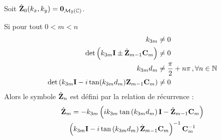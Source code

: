         \begin{thm}
            Soit $\hat {\mathbf{Z}}_0(k_x,k_y) = \mathbf{0}_{\mathcal{M}_2(\mathbb C)}$.

            Si pour tout $0<m < n$
            \begin{align}
                k_{3m} &\not = 0 \\
                \det\left(k_{3m}\mathbf{I} \pm \hat {\mathbf{Z}}_{m-1}\mathbf{C}_m \right) &\not = 0 \\
                k_{3m}d_m &\not = \dfrac{\pi}{2}+n\pi\,, \forall n \in \mathbb N \\
                \det\left(k_{3m}\mathbf{I} - i\tan(k_{3m}d_m)\mathbf{Z}_{m-1}\mathbf{C}_m\right) &\not = 0
            \end{align}
            Alors le symbole $\hat {\mathbf{Z}}_n$ est défini par la relation de récurrence : 
            \begin{multline}
            \hat {\mathbf{Z}}_m = -k_{3m}
            \left(ik_{3m}\tan\left(k_{3m}d_m\right)\mathbf{I} - \hat {\mathbf{Z}}_{m-1}\mathbf{C}_m\right) \\
            \left(k_{3m}\mathbf{I} - i\tan\left(k_{3m}d_m\right)\hat {\mathbf{Z}}_{m-1}\mathbf{C}_m\right)^{-1}
            \mathbf{C}_m^{-1}
            \end{multline}
        \end{thm}

